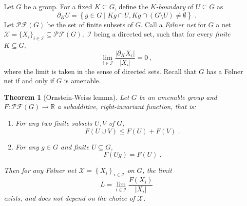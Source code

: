 \documentclass[12pt]{article}
\begin{document}
\newcommand{\Nset}{\ensuremath{\mathbb{N}}}
\newcommand{\Rset}{\ensuremath{\mathbb{R}}}
\newcommand{\Zset}{\ensuremath{\mathbb{Z}}}

\newtheorem{theorem*}{Theorem}

Let $G$ be a group.
For a fixed $K \subseteq G$,
define the \emph{$K$-boundary} of $U \subseteq G$ as
\begin{equation} \label{eq:bd}
\partial_K U = \left\{
g \in G \mid Kg \cap U, Kg \cap (G \setminus U) \neq \emptyset
\right\} \;.
\end{equation}
Let $\mathcal{PF}(G)$ be the set of finite subsets of $G$.
Call a \emph{F{\o}lner net} for $G$ a net
\begin{math}
\mathcal{X} = \{X_i\}_{i \in \mathcal{I}} \subseteq \mathcal{PF}(G),
\end{math}
$\mathcal{I}$ being a directed set,
such that for every \emph{finite} $K \subseteq G$,
\begin{equation} \label{eq:fo}
\lim_{i \in \mathcal{I}} \frac{|\partial_{K} X_i|}{|X_i|} = 0 \;,
\end{equation}
where the limit is taken in the sense of directed sets.
Recall that $G$ has a F{\o}lner net if and only if $G$ is amenable.

\begin{theorem*}[Ornstein-Weiss lemma]
Let $G$ be an amenable group and
\begin{math}
F : \mathcal{PF}(G) \to \Rset
\end{math}
a subadditive, right-invariant function, that is:
\begin{enumerate}
\item \label{it:sa}
For any two finite subsets $U,V$ of $G$,
\begin{equation} \label{eq:sa}
F(U \cup V) \leq F(U) + F(V) \;.
\end{equation}
\item \label{it:ri}
For any $g \in G$ and finite $U \subseteq G$,
\begin{equation} \label{eq:ri}
F(Ug) = F(U) \;.
\end{equation}
\end{enumerate}
Then for any F{\o}lner net
\begin{math}
\mathcal{X} = \left\{ X_i \right\}_{i \in \mathcal{I}}
\end{math}
on $G$, the limit
\begin{equation} \label{eq:ow}
L = \lim_{i \in \mathcal{I}} \frac{F(X_i)}{|X_i|}
\end{equation}
exists, and does not depend on the choice of $\mathcal{X}$.
\end{theorem*}
\end{document}
